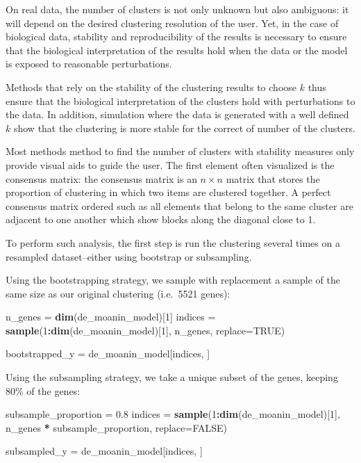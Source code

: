 \documentclass[9pt,a4paper,]{extarticle}
\newenvironment{Shaded}{\begin{snugshade}}{\end{snugshade}}
\newcommand{\DataTypeTok}[1]{\textcolor[rgb]{0.13,0.29,0.53}{#1}}
\newcommand{\DecValTok}[1]{\textcolor[rgb]{0.00,0.00,0.81}{#1}}
\newcommand{\FloatTok}[1]{\textcolor[rgb]{0.00,0.00,0.81}{#1}}
\newcommand{\KeywordTok}[1]{\textcolor[rgb]{0.13,0.29,0.53}{\textbf{#1}}}
\newcommand{\NormalTok}[1]{#1}
\newcommand{\OperatorTok}[1]{\textcolor[rgb]{0.81,0.36,0.00}{\textbf{#1}}}
\newcommand{\OtherTok}[1]{\textcolor[rgb]{0.56,0.35,0.01}{#1}}
\newcommand{\StringTok}[1]{\textcolor[rgb]{0.31,0.60,0.02}{#1}}
\begin{document}
On real data, the number of clusters is not only unknown but also
ambiguous: it will depend on the desired clustering resolution of the user.
Yet, in the case of biological data, stability and reproducibility of the
results is necessary to ensure that the biological interpretation of the
results hold when the data or the model is exposed to reasonable
perturbations.

Methods that rely on the stability of the clustering results to choose \(k\)
thus ensure that the biological interpretation of the clusters hold with
perturbations to the data. In addition, simulation where the data is generated
with a well defined \(k\) show that the clustering is more stable for the
correct of number of the clusters.

Most methods method to find the number of clusters with stability measures
only provide visual aids to guide the user. The first element often visualized
is the consensus matrix: the consensus matrix is an \(n \times n\) matrix that
stores the proportion of clustering in which two items are clustered together.
A perfect consensus matrix ordered such as all elements that belong to the
same cluster are adjacent to one another which show blocks along the diagonal
close to 1.

To perform such analysis, the first step is run the clustering several times
on a resampled dataset--either using bootstrap or subsampling.

Using the bootstrapping strategy, we sample with replacement a sample of the
same size as our original clustering (i.e.~5521 genes):

\begin{Shaded}
\begin{Highlighting}[]
\NormalTok{n_genes =}\StringTok{ }\KeywordTok{dim}\NormalTok{(de_moanin_model)[}\DecValTok{1}\NormalTok{]}
\NormalTok{indices =}\StringTok{ }\KeywordTok{sample}\NormalTok{(}\DecValTok{1}\OperatorTok{:}\KeywordTok{dim}\NormalTok{(de_moanin_model)[}\DecValTok{1}\NormalTok{], n_genes, }\DataTypeTok{replace=}\OtherTok{TRUE}\NormalTok{)}

\NormalTok{bootstrapped_y =}\StringTok{ }\NormalTok{de_moanin_model[indices, ]}
\end{Highlighting}
\end{Shaded}

Using the subsampling strategy, we take a unique subset of the genes, keeping 80\% of the genes:

\begin{Shaded}
\begin{Highlighting}[]
\NormalTok{subsample_proportion =}\StringTok{ }\FloatTok{0.8}
\NormalTok{indices =}\StringTok{ }\KeywordTok{sample}\NormalTok{(}\DecValTok{1}\OperatorTok{:}\KeywordTok{dim}\NormalTok{(de_moanin_model)[}\DecValTok{1}\NormalTok{],}
\NormalTok{         n_genes }\OperatorTok{*}\StringTok{ }\NormalTok{subsample_proportion,}
         \DataTypeTok{replace=}\OtherTok{FALSE}\NormalTok{)}

\NormalTok{subsampled_y =}\StringTok{ }\NormalTok{de_moanin_model[indices, ]}
\end{Highlighting}
\end{Shaded}
\end{document}
